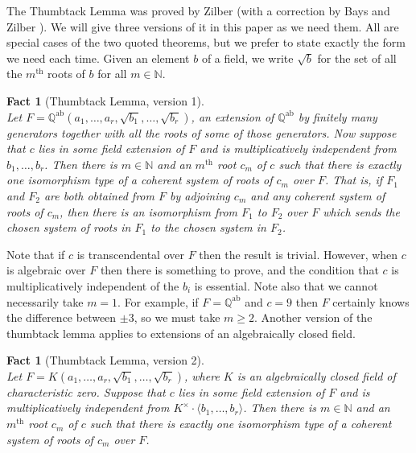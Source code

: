 \documentclass[12pt]{amsart}
\newtheorem{fact}[prop]{Fact}
\theoremstyle{definition}
\begin{document}
The Thumbtack Lemma was proved by Zilber \cite[Theorem~2]{Zilber06covers} (with a correction by Bays and Zilber \cite[Theorem~2.3]{BZ11}). We will give three versions of it in this paper as we need them. All are special cases of the two quoted theorems, but we prefer to state exactly the form we need each time. Given an element $b$ of a field, we write $\sqrt{b}$ for the set of all the $m{{\ensuremath{{}^{\mathrm{th}}}}}$ roots of $b$ for all $m \in {\ensuremath{\mathbb{N}}}$.
\begin{fact}[Thumbtack Lemma, version 1]\label{thumbtack1} \ \\
  Let $F = {{\ensuremath{\mathbb{Q}}}^{\mathrm{ab}}}(a_1,\ldots,a_r,\sqrt{b_1},\ldots,\sqrt{b_r})$, an extension of ${{\ensuremath{\mathbb{Q}}}^{\mathrm{ab}}}$ by finitely many generators together with all the roots of some of those generators. Now suppose that $c$ lies in some field extension of $F$ and is multiplicatively independent from $b_1,\ldots,b_r$. Then there is $m \in {\ensuremath{\mathbb{N}}}$ and an $m{{\ensuremath{{}^{\mathrm{th}}}}}$ root $c_m$ of $c$ such that there is exactly one isomorphism type of a coherent system of roots of $c_m$ over $F$. That is, if $F_1$ and $F_2$ are both obtained from $F$ by adjoining $c_m$ and any coherent system of roots of $c_m$, then there is an isomorphism from $F_1$ to $F_2$ over $F$ which sends the chosen system of roots in $F_1$ to the chosen system in $F_2$. 
\end{fact}
Note that if $c$ is transcendental over $F$ then the result is trivial. However, when $c$ is algebraic over $F$ then there is something to prove, and the condition that $c$ is multiplicatively independent of the $b_i$ is essential. Note also that we cannot necessarily take $m=1$. For example, if $F = {{\ensuremath{\mathbb{Q}}}^{\mathrm{ab}}}$ and $c = 9$ then $F$ certainly knows the difference between $\pm 3$, so we must take $m {\ensuremath{\geqslant}} 2$. Another version of the thumbtack lemma applies to extensions of an algebraically closed field.

\begin{fact}[Thumbtack Lemma, version 2]\ \\
  Let $F = K(a_1,\ldots,a_r,\sqrt{b_1},\ldots,\sqrt{b_r})$, where $K$ is an algebraically closed field of characteristic zero. Suppose that $c$ lies in some field extension of $F$ and is multiplicatively independent from $K^{\ensuremath{\times}} \cdot \langle b_1,\ldots,b_r \rangle$. Then there is $m \in {\ensuremath{\mathbb{N}}}$ and an $m{{\ensuremath{{}^{\mathrm{th}}}}}$ root $c_m$ of $c$ such that there is exactly one isomorphism type of a coherent system of roots of $c_m$ over $F$.
\end{fact}
\end{document}
